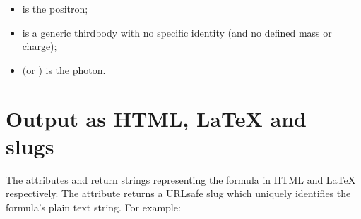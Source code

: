 \documentclass[letterpaper,10pt,english]{sphinxmanual}
\begin{document}
\begin{itemize}
\begin{description}
\begin{itemize}
\item {} 
 is the positron;

\item {} 
 is a generic third\sphinxhyphen{}body with no specific identity (and no defined mass or charge);

\item {} 
 (or ) is the photon.

\end{itemize}

\end{description}

\end{itemize}


\section{Output as HTML, LaTeX and slugs}
\label{\detokenize{formula:output-as-html-latex-and-slugs}}
The  attributes  and  return strings representing the formula in HTML and LaTeX respectively. The attribute  returns a URL\sphinxhyphen{}safe slug which uniquely identifies the formula’s plain text string. For example:
\end{document}
